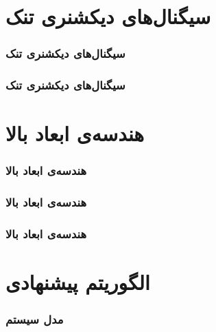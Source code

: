 
\section{سیگنال‌های دیکشنری تنک\hfill}

\begin{frame}
\frametitle{سیگنال‌های دیکشنری تنک}

\end{frame}

\begin{frame}
\frametitle{سیگنال‌های دیکشنری تنک}

\end{frame}

\section{هندسه‌ی ابعاد بالا\hfill}

\begin{frame}
\frametitle{هندسه‌ی ابعاد بالا}

\end{frame}

\begin{frame}
\frametitle{هندسه‌ی ابعاد بالا}
\framesubtitle{}

\end{frame}

\begin{frame}
\frametitle{هندسه‌ی ابعاد بالا}
\framesubtitle{}
\end{frame}


\section{الگوریتم پیشنهادی\hfill}

\begin{frame}
\frametitle{مدل سیستم}

\begin{figure}
	\centering
	
\end{figure}

\end{frame}

